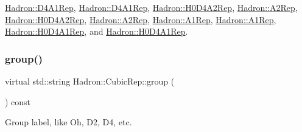 \mbox{\hyperlink{structHadron_1_1D4A1Rep_a4224f0d47cc0a894a9da4c8505d51c29}{Hadron\+::\+D4\+A1\+Rep}}, \mbox{\hyperlink{structHadron_1_1D4A1Rep_a4224f0d47cc0a894a9da4c8505d51c29}{Hadron\+::\+D4\+A1\+Rep}}, \mbox{\hyperlink{structHadron_1_1H0D4A2Rep_a637522dc6caee2869b2bb632a4c5a5b5}{Hadron\+::\+H0\+D4\+A2\+Rep}}, \mbox{\hyperlink{structHadron_1_1A2Rep_a6c2da481eeb98634c640e8f17a569eea}{Hadron\+::\+A2\+Rep}}, \mbox{\hyperlink{structHadron_1_1H0D4A2Rep_a637522dc6caee2869b2bb632a4c5a5b5}{Hadron\+::\+H0\+D4\+A2\+Rep}}, \mbox{\hyperlink{structHadron_1_1A2Rep_a6c2da481eeb98634c640e8f17a569eea}{Hadron\+::\+A2\+Rep}}, \mbox{\hyperlink{structHadron_1_1A1Rep_a0d1f85837b8f29f9e51656b8bf2abfed}{Hadron\+::\+A1\+Rep}}, \mbox{\hyperlink{structHadron_1_1A1Rep_a0d1f85837b8f29f9e51656b8bf2abfed}{Hadron\+::\+A1\+Rep}}, \mbox{\hyperlink{structHadron_1_1H0D4A1Rep_ab13ff026da1bc59df4b52835038296d5}{Hadron\+::\+H0\+D4\+A1\+Rep}}, and \mbox{\hyperlink{structHadron_1_1H0D4A1Rep_ab13ff026da1bc59df4b52835038296d5}{Hadron\+::\+H0\+D4\+A1\+Rep}}.

\mbox{\label{structHadron_1_1CubicRep_a0748f11ec87f387062c8e8981339a29c}} 
\subsubsection{\texorpdfstring{group()}{group()}\hspace{0.1cm}{\footnotesize\ttfamily [1/2]}}
{\footnotesize\ttfamily virtual std\+::string Hadron\+::\+Cubic\+Rep\+::group (\begin{DoxyParamCaption}{ }\end{DoxyParamCaption}) const\hspace{0.3cm}{\ttfamily [pure virtual]}}

Group label, like Oh, D2, D4, etc. 

